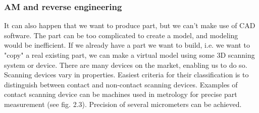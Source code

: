 \documentclass[a4paper, 11pt, reqno]{report}
\begin{document}
\subsubsection{AM and reverse engineering}
It can also happen that we want to produce part, but we can't make use of CAD software. The part can be too complicated to create a model, and modeling would be inefficient. If we already have a part we want to build, i.e. we want to "copy" a real existing part, we can make a virtual model using some 3D scanning system or device. There are many devices on the market, enabling us to do so. Scanning devices vary in properties. Easiest criteria for their classification is to distinguish between contact and non-contact scanning devices. Examples of contact scanning device can be machines used in metrology for precise part measurement (see fig. 2.3). Precision of several micrometers can be achieved.\\
%
\end{document}
